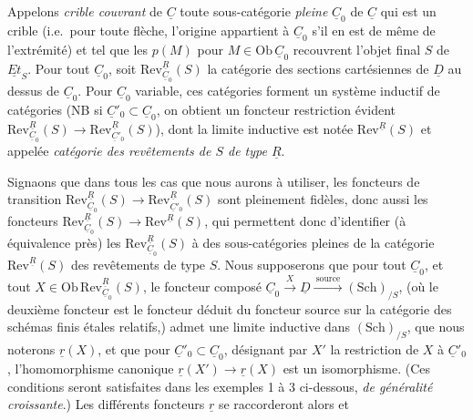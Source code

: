 \documentclass[11pt,a4paper]{article}
\begin{document}
Appelons \emph{crible couvrant} de $\underline{C}$ toute sous-catégorie
\emph{pleine} $\underline{C}_0$ de $\underline{C}$ qui est un crible (i.e.\
pour toute flèche, l'origine appartient à $\underline{C}_0$ s'il en est de même
de l'extrémité) et tel que les $p(M)$ pour $M \in \mathrm{Ob}\,\underline{C}_0$
recouvrent l'objet final $S$ de $\underline{Et}_S$. Pour tout $\underline{C}_0$,
soit $\mathrm{Rev}^{\underline{R}}_{\underline{C}_0}(S)$ la catégorie des
sections cartésiennes de $\underline{D}$ au dessus de $\underline{C}_0$. Pour
$\underline{C}_0$ variable, ces catégories forment \struck{\ill{}} un système
inductif de catégories \struck{\ill{}} (NB si $\underline{C}'_0 \subset
\underline{C}_0$, on obtient un foncteur restriction évident
$\mathrm{Rev}^{\underline{R}}_{\underline{C}_0}(S) \to
\mathrm{Rev}^{\underline{R}}_{\underline{C}'_0}(S)$),  dont la
limite inductive est notée $\mathrm{Rev}^{\underline{R}}(S)$ et appelée
\emph{catégorie des revêtements de $S$ de type $\underline{R}$}.

Signaons que dans tous les cas que nous aurons à utiliser, les foncteurs de
transition $\mathrm{Rev}^{\underline{R}}_{\underline{C}_0}(S) \to
\mathrm{Rev}^{\underline{R}}_{\underline{C}'_0}(S)$ sont pleinement fidèles,
donc aussi les foncteurs $\mathrm{Rev}^{\underline{R}}_{\underline{C}_0}(S)
\to \mathrm{Rev}^{\underline{R}}(S)$, qui permettent donc d'identifier (à
équivalence près) les $\mathrm{Rev}^{\underline{R}}_{\underline{C}_0}(S)$ à des
sous-catégories pleines de la catégorie $\mathrm{Rev}^{\underline{R}}(S)$ des
revêtements de type $S$. Nous supposerons \struck{de plus} que pour tout
$\underline{C}_0$, \struck{le foncteur composé} et tout $X \in
\mathrm{Ob}\,\mathrm{Rev}^{\underline{R}}_{\underline{C}_0}(S)$, le foncteur
composé $\underline{C}_0 \xrightarrow{\ X\ } \underline{D}
\xrightarrow{\ \text{source}\ } (\mathrm{Sch})_{/S}$, (où le deuxième foncteur
est le foncteur déduit du foncteur source sur la catégorie des schémas finis
étales relatifs,) admet une limite inductive dans $(\mathrm{Sch})_{/S}$, que
nous noterons $\underline{r}(X)$, et que pour $\underline{C}'_0 \subset
\underline{C}_0$, désignant par $X'$ la restriction de $X$ à
$\underline{C}'_0$, l'homomorphisme canonique $\underline{r}(X') \to
\underline{r}(X)$ est un isomorphisme. (Ces conditions seront satisfaites dans
les exemples 1 à 3 ci-dessous, \emph{de généralité croissante}.) Les différents
foncteurs $\underline{r}$ se raccorderont alors et
\end{document}
